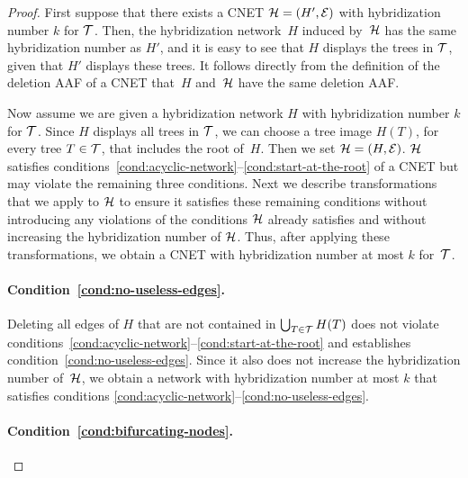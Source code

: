 \begin{proof}
  First suppose that there exists a CNET $\mathcal{H} = (H', \mathcal{E})$ with hybridization number $k$ for $\mathcal{T}$. Then, the hybridization network~$H$ induced by~$\mathcal{H}$ has the same hybridization number as $H'$, and it is easy to see that $H$ displays the trees in $\mathcal{T}$,   given that $H'$ displays these trees. It follows directly from the definition of the deletion AAF of a CNET that~$H$ and~$\mathcal{H}$ have the same deletion AAF.

  Now assume we are given a hybridization network $H$ with hybridization number $k$ for $\mathcal{T}$. Since $H$ displays all trees in $\mathcal{T}$, we can choose a tree image $H(T)$, for every tree $T \in \mathcal{T}$, that includes the root of~$H$. Then we set $\mathcal{H} = (H, \mathcal{E})$. $\mathcal{H}$ satisfies conditions~\ref{cond:acyclic-network}--\ref{cond:start-at-the-root} of a CNET but may violate the remaining three conditions. Next we describe transformations that we apply to $\mathcal{H}$ to ensure it satisfies these remaining conditions without introducing any violations of the conditions $\mathcal{H}$ already satisfies and without increasing the hybridization number of $\mathcal{H}$. Thus, after applying these transformations, we obtain a {CNET} with hybridization number at most $k$ for~$\mathcal{T}$.

  \paragraph{Condition~\ref{cond:no-useless-edges}.}

  Deleting all edges of $H$ that are not contained in $\bigcup_{T \in \mathcal{T}}H(T)$   does not violate   conditions~\ref{cond:acyclic-network}--\ref{cond:start-at-the-root} and   establishes condition~\ref{cond:no-useless-edges}.   Since it also does not increase the hybridization number of~$\mathcal{H}$, we obtain   a network with hybridization number at most $k$  that satisfies conditions 
  \ref{cond:acyclic-network}--\ref{cond:no-useless-edges}.

  \paragraph{Condition~\ref{cond:bifurcating-nodes}.}


\end{proof}
